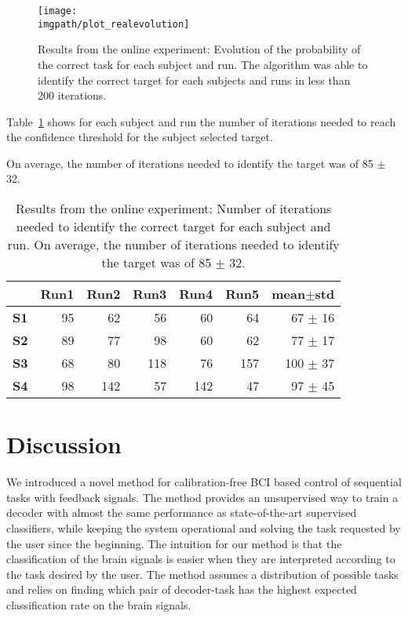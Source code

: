 \begin{figure}[!htbp]
    \centering
    \texttt{[image: \\imgpath/plot\_realevolution]}    
    \caption{Results from the online experiment: Evolution of the probability of the correct task for each subject and run. The algorithm was able to identify the correct target for each subjects and runs in less than 200 iterations.}
    \label{fig:online_results} 
\end{figure}

Table~\ref{ch6tab:steps} shows for each subject and run the number of iterations needed to reach the confidence threshold for the subject selected target.

On average, the number of iterations needed to identify the target was of 85 $\pm$ 32.

\begin{table}[!ht]
\centering
\begin{footnotesize}
\begin{tabular}{r|rrrrr|r}
    & \textbf{Run1} & \textbf{Run2} & \textbf{Run3} & \textbf{Run4} & \textbf{Run5} & \textbf{mean$\pm$std} \\\hline
    \textbf{S1} & 95 & 62 & 56 & 60 & 64 & 67 $\pm$ 16 \\
    \textbf{S2} & 89 & 77 & 98 & 60 & 62  & 77 $\pm$ 17 \\
    \textbf{S3} & 68 & 80 & 118 & 76 & 157 & 100 $\pm$ 37 \\
    \textbf{S4} & 98 & 142 & 57 & 142 & 47 & 97 $\pm$ 45 \\
\end{tabular}
\end{footnotesize}
  \caption{Results from the online experiment: Number of iterations needed to identify the correct target for each subject and run. On average, the number of iterations needed to identify the target was of 85 $\pm$ 32.}
  \label{ch6tab:steps}
\end{table}

\section{Discussion}

We introduced a novel method for calibration-free BCI based control of sequential tasks with feedback signals. The method provides an unsupervised way to train a decoder with almost the same performance as state-of-the-art supervised classifiers, while keeping the system operational and solving the task requested by the user since the beginning. 
%
The intuition for our method is that the classification of the brain signals is easier when they are interpreted according to the task desired by the user. The method assumes a distribution of possible tasks and relies on finding which pair of decoder-task has the highest expected classification rate on the brain signals. 


